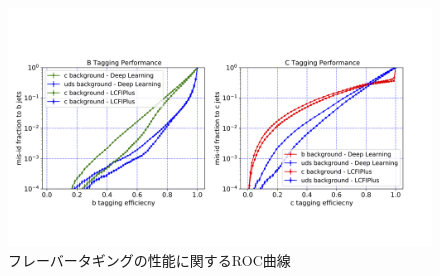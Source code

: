 \begin{figure}[htbp]
 \centering
 \includegraphics[width=1.0\textwidth, clip]{Figure/5Comparison/5-2-3-1FlavorTaggingROCCurve.png}
 \caption[フレーバータギングの性能に関するROC曲線]{フレーバータギングの性能に関するROC曲線}
 \label{5-2-3-1FlavorTaggingROCCurve}
\end{figure}























